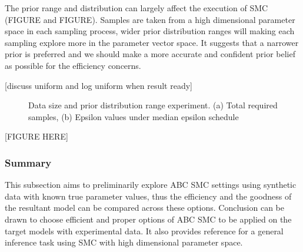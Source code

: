 The prior range and distribution can largely affect the execution of SMC (FIGURE and FIGURE). Samples are taken from a high dimensional parameter space in each sampling process, wider prior distribution ranges will making each sampling explore more in the parameter vector space. It suggests that a narrower prior is preferred and we should make a more accurate and confident prior belief as possible for the efficiency concerns.

    [discuss uniform and log uniform when result ready]

\begin{figure}
    \begin{center}
    \end{center}

    \caption[Data size and prior distribution range experiment]%
    {Data size and prior distribution range experiment. (a) Total required samples, (b) Epsilon values under median epsilon schedule}
    \label{fig:size}

\end{figure}

[FIGURE HERE]


\subsubsection{Summary} This subsection aims to preliminarily explore ABC SMC settings using synthetic data with known true parameter values, thus the efficiency and the goodness of the resultant model can be compared across these options. Conclusion can be drawn to choose efficient and proper options of ABC SMC to be applied on the target models with experimental data. It also provides reference for a general inference task using SMC with high dimensional parameter space.








